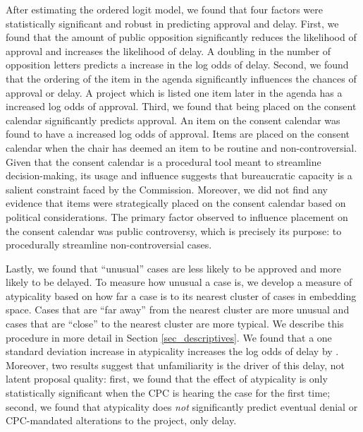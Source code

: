 After estimating the ordered logit model, we found that four factors were statistically significant and robust in predicting approval and delay. First, we found that the amount of public opposition significantly reduces the likelihood of approval and increases the likelihood of delay. A doubling in the number of opposition letters predicts a  increase in the log odds of delay. Second, we found that the ordering of the item in the agenda significantly influences the chances of approval or delay. A project which is listed one item later in the agenda has a  increased log odds of approval. 
Third, we found that being placed on the consent calendar significantly predicts approval. An item on the consent calendar was found to have a  increased log odds of approval. Items are placed on the consent calendar when the chair has deemed an item to be routine and non-controversial. 
Given that the consent calendar is a procedural tool meant to streamline decision-making, its usage and influence suggests that bureaucratic capacity is a salient constraint faced by the Commission.
Moreover, we did not find any evidence that items were strategically placed on the consent calendar based on political considerations. The primary factor observed to influence placement on the consent calendar was public controversy, which is precisely its purpose: to procedurally streamline non-controversial cases.


Lastly, we found that ``unusual'' cases are less likely to be approved and more likely to be delayed. To measure how unusual a case is, we develop a measure of atypicality based on how far a case is to its nearest cluster of cases in embedding space. Cases that are ``far away'' from the nearest cluster are more unusual and cases that are ``close'' to the nearest cluster are more typical. We describe this procedure in more detail in Section \ref{sec_descriptives}. We found that a one standard deviation increase in atypicality increases the log odds of delay by . Moreover, two results suggest that unfamiliarity is the driver of this delay, not latent proposal quality: first, we found that the effect of atypicality is only statistically significant when the CPC is hearing the case for the first time; second, we found that atypicality does \emph{not} significantly predict eventual denial or CPC-mandated alterations to the project, only delay. 

